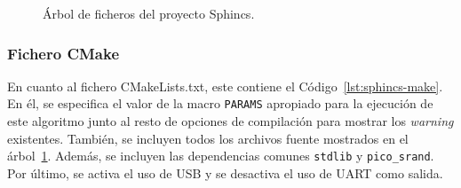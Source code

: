\begin{figure}[H]
\centering
{}
\caption{Árbol de ficheros del proyecto Sphincs.}
\label{tree:sphincs}
\end{figure}


\subsubsection{Fichero CMake}\label{subsubsec:sphincs-cmake}

En cuanto al fichero CMakeLists.txt, este contiene el Código~\ref{lst:sphincs-make}.
En él, se especifica el valor de la macro \texttt{PARAMS} apropiado para la ejecución de este algoritmo junto al resto de opciones de compilación para mostrar los \textit{warning} existentes.
También, se incluyen todos los archivos fuente mostrados en el árbol~\ref{tree:sphincs}.
Además, se incluyen las dependencias comunes \texttt{stdlib} y \texttt{pico\_srand}.
Por último, se activa el uso de \ac{USB} y se desactiva el uso de \ac{UART} como salida.

